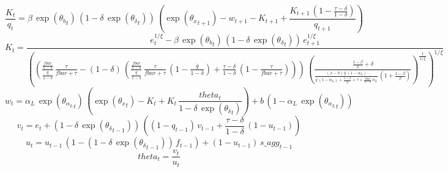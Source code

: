 \begin{dmath}
\frac{{{K}}_{t}}{{{q}}_{t}}={{\beta}}\, \exp\left({{\theta_b}}_{t}\right)\, \left(1-{{\delta}}\, \exp\left({{\theta_{\delta}}}_{t}\right)\right)\, \left(\exp\left({{\theta_x}}_{t+1}\right)-{{w}}_{t+1}-{{K}}_{t+1}+\frac{{{K}}_{t+1}\, \left(1-\frac{{{\tau}}-{{\delta}}}{1-{{\delta}}}\right)}{{{q}}_{t+1}}\right)
\end{dmath}
\begin{dmath}
{{K}}_{t}=\frac{{{e}}_{t}^{{{1/\xi}}}-{{\beta}}\, \exp\left({{\theta_b}}_{t}\right)\, \left(1-{{\delta}}\, \exp\left({{\theta_{\delta}}}_{t}\right)\right)\, {{e}}_{t+1}^{{{1/\xi}}}}{\left(\left(\frac{\frac{{fbar}}{1-{{\delta}}}}{\frac{{{\overline{q}}}}{1-{{\delta}}}}\, \frac{{{\tau}}}{{fbar}+{{\tau}}}-\left(1-{{\delta}}\right)\, \left(\frac{\frac{{fbar}}{1-{{\delta}}}}{\frac{{{\overline{q}}}}{1-{{\delta}}}}\, \frac{{{\tau}}}{{fbar}+{{\tau}}}\, \left(1-\frac{{{\overline{q}}}}{1-{{\delta}}}\right)+\frac{{{\tau}}-{{\delta}}}{1-{{\delta}}}\, \left(1-\frac{{{\tau}}}{{fbar}+{{\tau}}}\right)\right)\right)\, \left(\frac{\frac{1-{{\beta}}}{{{\beta}}}+{{\delta}}}{\frac{\left({{x}}-{b}\right)\, {{\overline{q}}}\, \left(1-{\alpha_L}\right)}{{{\overline{q}}}\, \left(1-{\alpha_L}\right)+\frac{1-{{\beta}}}{{{\beta}}}+{{\tau}}+\frac{{fbar}}{1-{{\delta}}}\, {\alpha_L}}\, \left(1+\frac{1-{{\beta}}}{{{\beta}}}\right)}\right)^{\frac{1}{{{1/\xi}}}}\right)^{{{1/\xi}}}}
\end{dmath}
\begin{dmath}
{{w}}_{t}={\alpha_L}\, \exp\left({{\theta_{\alpha_L}}}_{t}\right)\, \left(\exp\left({{\theta_x}}_{t}\right)-{{K}}_{t}+{{K}}_{t}\, \frac{{{theta}}_{t}}{1-{{\delta}}\, \exp\left({{\theta_{\delta}}}_{t}\right)}\right)+{b}\, \left(1-{\alpha_L}\, \exp\left({{\theta_{\alpha_L}}}_{t}\right)\right)
\end{dmath}
\begin{dmath}
{{v}}_{t}={{e}}_{t}+\left(1-{{\delta}}\, \exp\left({{\theta_{\delta}}}_{t-1}\right)\right)\, \left(\left(1-{{q}}_{t-1}\right)\, {{v}}_{t-1}+\frac{{{\tau}}-{{\delta}}}{1-{{\delta}}}\, \left(1-{{u}}_{t-1}\right)\right)
\end{dmath}
\begin{dmath}
{{u}}_{t}={{u}}_{t-1}\, \left(1-\left(1-{{\delta}}\, \exp\left({{\theta_{\delta}}}_{t-1}\right)\right)\, {{f}}_{t-1}\right)+\left(1-{{u}}_{t-1}\right)\, {s\_agg}_{t-1}
\end{dmath}
\begin{dmath}
{{theta}}_{t}=\frac{{{v}}_{t}}{{{u}}_{t}}
\end{dmath}

